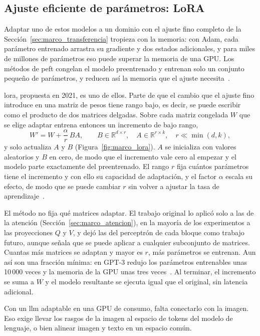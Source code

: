 \subsection{Ajuste eficiente de parámetros: LoRA}
\label{sec:marco_llm_lora}

Adaptar uno de estos modelos a un dominio con el ajuste fino completo de la
Sección~\ref{sec:marco_transferencia} tropieza con la memoria: con Adam, cada parámetro entrenado arrastra su
gradiente y dos estados adicionales, y para miles de millones de parámetros eso puede superar la memoria de una
GPU. Los métodos de \gls{peft} congelan el modelo preentrenado y entrenan solo un conjunto pequeño de
parámetros, y reducen así la memoria que el ajuste necesita~\cite{hu2021lora}.

\Gls{lora}, propuesta en 2021, es uno de ellos. Parte de que el cambio que el ajuste fino introduce en una
matriz de pesos tiene rango bajo, es decir, se puede escribir como el producto de dos matrices delgadas. Sobre
cada matriz congelada $W$ que se elige adaptar entrena entonces un incremento de bajo rango,
\begin{equation}
    W' = W + \frac{\alpha}{r}\,BA, \qquad B \in \mathbb{R}^{d\times r},\quad A \in \mathbb{R}^{r\times k},\quad
    r \ll \min(d, k),
    \label{eq:marco_lora}
\end{equation}
y solo actualiza $A$ y $B$ (Figura~\ref{fig:marco_lora}). $A$ se inicializa con valores aleatorios y $B$ en
cero, de modo que el incremento vale cero al empezar y el modelo parte exactamente del preentrenado. El rango
$r$ fija cuántos parámetros tiene el incremento y con ello su capacidad de adaptación, y el factor $\alpha$
escala su efecto, de modo que se puede cambiar $r$ sin volver a ajustar la tasa de
aprendizaje~\cite{hu2021lora}.



El método no fija qué matrices adaptar. El trabajo original lo aplicó solo a las de la atención
(Sección~\ref{sec:marco_atencion}), en la mayoría de los experimentos a las proyecciones $Q$ y $V$, y dejó las
del perceptrón de cada bloque como trabajo futuro, aunque señala que se puede aplicar a cualquier subconjunto de
matrices. Cuantas más matrices se adaptan y mayor es
$r$, más parámetros se entrenan. Aun así son una fracción mínima: en GPT-3 redujo los parámetros entrenables
unas 10\,000 veces y la memoria de la GPU unas tres veces~\cite{hu2021lora}. Al terminar, el incremento se suma
a $W$ y el modelo resultante se ejecuta igual que el original, sin latencia adicional.

Con un \gls{llm} adaptable en una GPU de consumo, falta conectarlo con la imagen. Eso exige llevar los rasgos
de la imagen al espacio de tokens del modelo de lenguaje, o bien alinear imagen y texto en un espacio común.
